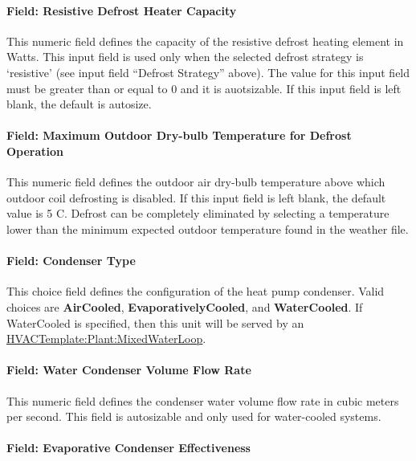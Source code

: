 \paragraph{Field: Resistive Defrost Heater Capacity}\label{field-resistive-defrost-heater-capacity-000}

This numeric field defines the capacity of the resistive defrost heating element in Watts. This input field is used only when the selected defrost strategy is `resistive' (see input field ``Defrost Strategy'' above). The value for this input field must be greater than or equal to 0 and it is auotsizable. If this input field is left blank, the default is autosize.

\paragraph{Field: Maximum Outdoor Dry-bulb Temperature for Defrost Operation}\label{field-maximum-outdoor-dry-bulb-temperature-for-defrost-operation-000}

This numeric field defines the outdoor air dry-bulb temperature above which outdoor coil defrosting is disabled. If this input field is left blank, the default value is 5 C. Defrost can be completely eliminated by selecting a temperature lower than the minimum expected outdoor temperature found in the weather file.

\paragraph{Field: Condenser Type}\label{field-condenser-type-000}

This choice field defines the configuration of the heat pump condenser. Valid choices are \textbf{AirCooled}, \textbf{EvaporativelyCooled}, and \textbf{WaterCooled}. If WaterCooled is specified, then this unit will be served by an \hyperref[hvactemplateplantmixedwaterloop]{HVACTemplate:Plant:MixedWaterLoop}.

\paragraph{Field: Water Condenser Volume Flow Rate}\label{field-water-condenser-volume-flow-rate}

This numeric field defines the condenser water volume flow rate in cubic meters per second. This field is autosizable and only used for water-cooled systems.

\paragraph{Field: Evaporative Condenser Effectiveness}\label{field-evaporative-condenser-effectiveness-000}

